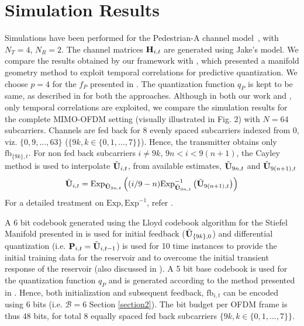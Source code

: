 \documentclass[conference]{IEEEtran}
\begin{document}
{\section{Simulation Results}
\label{section4}
Simulations have been performed for the Pedestrian-A channel model~\cite{3rd2009lte}, with $N_T=4$, $N_R=2$.  The channel matrices ${\bf H}_{i,t}$ are generated using Jake's model.
We compare the results obtained by our framework with \cite{6891198}, which presented a manifold geometry method to exploit temporal correlations for predictive quantization.
We choose $p=4$ for the $f_P$ presented in \cite{6891198}.
The quantization function $q_P$ is kept to be same, as described in \cite{6545375,6891198} for both the approaches.
Although in both our work and \cite{6891198}, only temporal correlations are exploited, we compare the simulation results for the complete MIMO-OFDM setting (visually illustrated in Fig. 2) with $N=64$ subcarriers. Channels are fed back for $8$ evenly spaced subcarriers indexed from 0, viz. $\{0,9,\ldots,63\}$ ($\{9k, k \in \{0,1,\ldots,7\}\}$). Hence, the transmitter obtains only $\text{fb}_{\{9k\},t}$.
For non fed back subcarriers $i\neq 9k$, $9n < i < 9(n+1)$, the Cayley method \cite{Gupt1905:Predictive} is used to interpolate $\tilde{{\bf U}}_{i,t}$, from available estimates, $\tilde{{\bf U}}_{9n,t}$ and $\tilde{{\bf U}}_{9(n+1), t}$
\begin{equation}
\label{eqn:cayley_i1_i2}
  \tilde{\bU}_{i,t} =  \text{Exp}_{\tilde{\bU}_{9n, t}}\left((i/9-n)\text{Exp}^{-1}_{\tilde{\bU}_{9n, t}}\left(\tilde{\bU}_{9(n+1),t}\right)\right)
\end{equation}
For a detailed treatment on $\text{Exp}, \text{Exp}^{-1}$, refer \cite{DBLP:journals/corr/abs-1708-00045}.

A 6 bit codebook generated using the Lloyd codebook algorithm for the Stiefel Manifold presented in \cite{6678348} is used for initial feedback ($\tilde{{\bf U}}_{\{9k\},0}$) and differential quantization (i.e. ${\bf P}_{i,t}=\tilde{{\bf U}}_{i,t-1}$) is used for 10 time instances to provide the initial training data for the reservoir and to overcome the initial transient response of the reservoir (also discussed in \cite{mosleh2017brain}).
A 5 bit base codebook is used for the quantization function $q_P$ and is generated according to the method presented in \cite{Gupt1905:Predictive}.
Hence, both initialization and subsequent feedback, $\text{fb}_{i,t}$ can be encoded using 6 bits (i.e. $\mathcal{B}=6$ Section \ref{section2}).
The bit budget per OFDM frame is thus 48 bits, for total 8 equally spaced fed back subcarriers $\{9k, k \in \{0,1,\ldots,7\}\}$.

}
\end{document}
